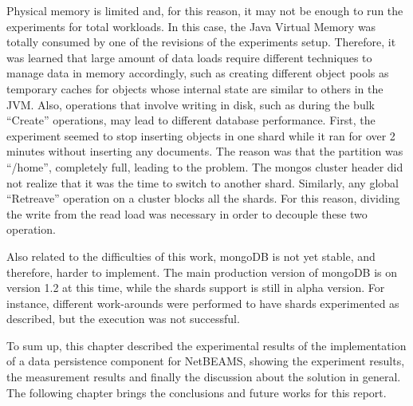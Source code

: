 Physical memory is limited and, for this reason, it may not be enough to run
the experiments for total workloads. In this case, the Java Virtual Memory was
totally consumed by one of the revisions of the experiments setup. Therefore, 
it was learned that large amount of data loads require different techniques to
manage data in memory accordingly, such as creating different object pools as
temporary caches for objects whose internal state are similar to others in the
JVM. Also, operations that involve writing in disk, such as during the bulk
``Create'' operations, may lead to different database performance. First, the
experiment seemed to stop inserting objects in one shard while it ran for over
2 minutes without inserting any documents. The reason was that the partition
was ``/home'', completely full, leading to the problem. The mongos cluster
header did not realize that it was the time to switch to another shard.
Similarly, any global ``Retreave'' operation on a cluster blocks all the
shards. For this reason, dividing the write from the read load was necessary
in order to decouple these two operation.

Also related to the difficulties of this work, mongoDB is not yet stable, and
therefore, harder to implement. The main production version of mongoDB
is on version 1.2 at this time, while the shards support is still in alpha
version. For instance, different work-arounds were performed to have shards
experimented as described, but the execution was not successful.

To sum up, this chapter described the experimental results of the
implementation of a data persistence component for NetBEAMS, showing the
experiment results, the measurement results and finally the discussion about
the solution in general. The following chapter brings the conclusions and
future works for this report.

